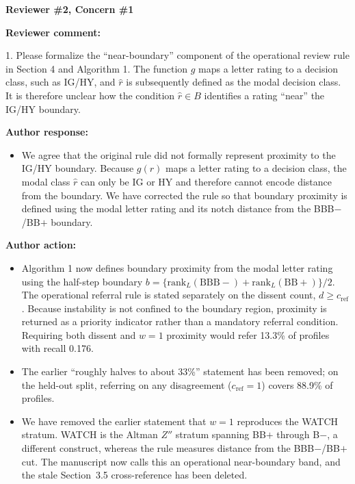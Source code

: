 \documentclass[11pt]{article}
\newcommand{\rvcomment}[1]{{\color{ReviewerGreen}#1}}
\newcommand{\concern}[1]{\textbf{\color{ReviewerGreen}#1}}
\begin{document}
\concern{Reviewer \#2, Concern \#1}

\concern{Reviewer comment:}

\rvcomment{1. Please formalize the ``near-boundary'' component of the operational review rule in
Section 4 and Algorithm 1. The function $g$ maps a letter rating to a decision class, such as
IG/HY, and $\hat r$ is subsequently defined as the modal decision class. It is therefore unclear how
the condition $\hat r \in B$ identifies a rating ``near'' the IG/HY boundary.}

\textbf{Author response:}

\begin{itemize}
\item We agree that the original rule did not formally represent proximity to the IG/HY boundary. Because
$g(r)$ maps a letter rating to a decision class, the modal class $\hat r$ can only be IG or HY and
therefore cannot encode distance from the boundary. We have corrected the rule so that boundary
proximity is defined using the modal letter rating and its notch distance from the BBB$-$/BB$+$
boundary.
\end{itemize}

\textbf{Author action:}

\begin{itemize}
\item Algorithm 1 now defines boundary proximity from the modal letter rating using the half-step boundary $b=\{\mathrm{rank}_L(\mathrm{BBB}-)+\mathrm{rank}_L(\mathrm{BB}+)\}/2$. The operational referral rule is stated separately on the dissent count, $d\ge c_{\mathrm{ref}}$. Because instability is not confined to the boundary region, proximity is returned as a priority indicator rather than a mandatory referral condition. Requiring both dissent and $w=1$ proximity would refer 13.3\% of profiles with recall 0.176.
\item The earlier ``roughly halves to about 33\%'' statement has been removed; on the held-out split, referring on any disagreement ($c_{\mathrm{ref}}=1$) covers 88.9\% of profiles.
\item We have removed the earlier statement that $w=1$ reproduces the WATCH stratum. WATCH is the Altman $Z''$ stratum spanning BB$+$ through B$-$, a different construct, whereas the rule measures distance from the BBB$-$/BB$+$ cut. The manuscript now calls this an operational near-boundary band, and the stale Section~3.5 cross-reference has been deleted.
\end{itemize}
\end{document}
